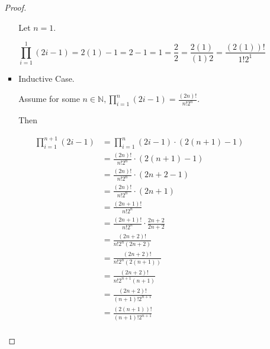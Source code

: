 \documentclass[12pt,letterpaper]{article}
\begin{document}
\begin{enumerate}
\begin{enumerate}
\begin{enumerate}
\begin{proof}
\begin{itemize}
                    Let $n = 1$.

                    \[
                      \prod\limits_{i = 1}^1(2i - 1) = 2(1) - 1 = 2 - 1 = 1 = \frac{2}{2} = \frac{2(1)}{(1)2} = \frac{\left(2\left(1\right)\right)!}{1! 2^1}
                    \]
                  \item Inductive Case.

                    Assume for some $n \in \mathbb{N}, \prod\limits_{i = 1}^{n}(2i - 1) = \frac{\left(2n\right)!}{n! 2^n}$.

                    Then

                    \begin{align*}
                      \prod\limits_{i = 1}^{n + 1}(2i - 1)
                      &= \prod\limits_{i = 1}^{n}(2i - 1) \cdot \left(2(n + 1) - 1\right) \\
                      &= \frac{\left(2n\right)!}{n! 2^n} \cdot \left(2(n + 1) - 1\right) \\
                      &= \frac{\left(2n\right)!}{n! 2^n} \cdot \left(2n + 2 - 1\right) \\
                      &= \frac{\left(2n\right)!}{n! 2^n} \cdot \left(2n + 1\right) \\
                      &= \frac{\left(2n + 1\right)!}{n! 2^n} \\
                      &= \frac{\left(2n + 1\right)!}{n! 2^n} \cdot \frac{2n + 2}{2n + 2} \\
                      &= \frac{\left(2n + 2\right)!}{n! 2^n \left(2n + 2\right)} \\
                      &= \frac{\left(2n + 2\right)!}{n! 2^n \left(2\left(n + 1\right)\right)} \\
                      &= \frac{\left(2n + 2\right)!}{n! 2^{n + 1} \left(n + 1\right)} \\
                      &= \frac{\left(2n + 2\right)!}{\left(n + 1\right)! 2^{n + 1}} \\
                      &= \frac{\left(2\left(n + 1\right)\right)!}{\left(n + 1\right)! 2^{n + 1}} \\
                    \end{align*}


\end{itemize}
\end{proof}
\end{enumerate}
\end{enumerate}
\end{enumerate}
\end{document}

